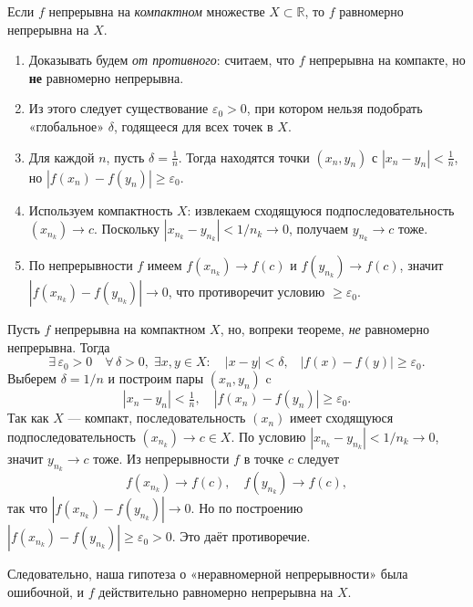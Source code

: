 
\begin{customtheorem}
	Если $f$ непрерывна на \emph{компактном} множестве $X \subset \mathbb{R}$,
	то $f$ равномерно непрерывна на $X$.
\end{customtheorem}

\begin{proofplan}
	\begin{enumerate}
		\item Доказывать будем \textit{от противного}: считаем, что $f$ непрерывна на компакте,
		      но \textbf{не} равномерно непрерывна.
		\item Из этого следует существование $\varepsilon_0>0$, при котором нельзя подобрать
		      «глобальное» $\delta$, годящееся для всех точек в $X$.
		\item Для каждой $n$, пусть $\delta = \frac{1}{n}$. Тогда находятся точки $(x_n,y_n)$
		      с $|x_n-y_n|<\tfrac{1}{n}$, но $|f(x_n)-f(y_n)|\ge\varepsilon_0$.
		\item Используем компактность $X$: извлекаем сходящуюся подпоследовательность $(x_{n_k})\to c$.
		      Поскольку $|x_{n_k}-y_{n_k}|<1/{n_k}\to 0$, получаем $y_{n_k}\to c$ тоже.
		\item По непрерывности $f$ имеем $f(x_{n_k})\to f(c)$ и $f(y_{n_k})\to f(c)$,
		      значит $|f(x_{n_k}) - f(y_{n_k})|\to 0$, что противоречит условию $\ge\varepsilon_0$.
	\end{enumerate}
\end{proofplan}

\begin{customproof}
	Пусть $f$ непрерывна на компактном $X$, но, вопреки теореме, \emph{не} равномерно непрерывна. Тогда
	\[
		\exists\,\varepsilon_0>0
		\quad\forall\,\delta>0,\;\exists x,y\in X :
		\quad |x-y|<\delta,\;\;\;|f(x)-f(y)| \ge \varepsilon_0.
	\]
	Выберем $\delta=1/n$ и построим пары $(x_n,y_n)$ c
	\[
		|x_n - y_n| < \tfrac{1}{n}, \quad |f(x_n)-f(y_n)| \ge \varepsilon_0.
	\]
	Так как $X$ — компакт, последовательность $(x_n)$ имеет сходящуюся подпоследовательность
	$(x_{n_k}) \to c\in X$. По условию $|x_{n_k}-y_{n_k}| < 1/{n_k}\to0$, значит $y_{n_k}\to c$ тоже.
	Из непрерывности $f$ в точке $c$ следует
	\[
		f(x_{n_k}) \to f(c),\quad f(y_{n_k}) \to f(c),
	\]
	так что $|f(x_{n_k}) - f(y_{n_k})|\to 0$. Но по построению
	$|f(x_{n_k}) - f(y_{n_k})|\ge \varepsilon_0 > 0$. Это даёт противоречие.

	Следовательно, наша гипотеза о «неравномерной непрерывности» была ошибочной,
	и $f$ действительно равномерно непрерывна на $X$.
\end{customproof}

